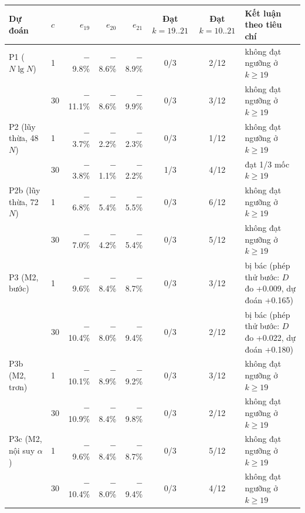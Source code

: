 \begin{tabularx}{\linewidth}{llrrrccX}
\toprule
Dự đoán & $c$ & $e_{19}$ & $e_{20}$ & $e_{21}$ & \makecell{Đạt \\ $k{=}19..21$} & \makecell{Đạt \\ $k{=}10..21$} & Kết luận theo tiêu chí \\
\midrule
P1 ($N\lg N$) & 1 & $-$9.8\% & $-$8.6\% & $-$8.9\% & 0/3 & 2/12 & không đạt ngưỡng ở $k\ge19$ \\
 & 30 & $-$11.1\% & $-$8.6\% & $-$9.9\% & 0/3 & 3/12 & không đạt ngưỡng ở $k\ge19$ \\
\addlinespace
P2 (lũy thừa, 48 $N$) & 1 & $-$3.7\% & $-$2.2\% & $-$2.3\% & 0/3 & 1/12 & không đạt ngưỡng ở $k\ge19$ \\
 & 30 & $-$3.8\% & $-$1.1\% & $-$2.2\% & 1/3 & 4/12 & đạt 1/3 mốc $k\ge19$ \\
\addlinespace
P2b (lũy thừa, 72 $N$) & 1 & $-$6.8\% & $-$5.4\% & $-$5.5\% & 0/3 & 6/12 & không đạt ngưỡng ở $k\ge19$ \\
 & 30 & $-$7.0\% & $-$4.2\% & $-$5.4\% & 0/3 & 5/12 & không đạt ngưỡng ở $k\ge19$ \\
\addlinespace
P3 (M2, bước) & 1 & $-$9.6\% & $-$8.4\% & $-$8.7\% & 0/3 & 3/12 & bị bác (phép thử bước: $D$ đo +0.009, dự đoán +0.165) \\
 & 30 & $-$10.4\% & $-$8.0\% & $-$9.4\% & 0/3 & 2/12 & bị bác (phép thử bước: $D$ đo +0.022, dự đoán +0.180) \\
\addlinespace
P3b (M2, trơn) & 1 & $-$10.1\% & $-$8.9\% & $-$9.2\% & 0/3 & 3/12 & không đạt ngưỡng ở $k\ge19$ \\
 & 30 & $-$10.9\% & $-$8.4\% & $-$9.8\% & 0/3 & 2/12 & không đạt ngưỡng ở $k\ge19$ \\
\addlinespace
P3c (M2, nội suy $\alpha$) & 1 & $-$9.6\% & $-$8.4\% & $-$8.7\% & 0/3 & 5/12 & không đạt ngưỡng ở $k\ge19$ \\
 & 30 & $-$10.4\% & $-$8.0\% & $-$9.4\% & 0/3 & 4/12 & không đạt ngưỡng ở $k\ge19$ \\
\bottomrule
\end{tabularx}
